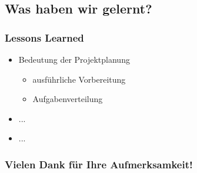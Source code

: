 \documentclass{beamer}
\begin{document}
	
	\subsection{Was haben wir gelernt?}
\begin{frame}
\frametitle{Lessons Learned}
\begin{itemize}
\item Bedeutung der Projektplanung
\begin{itemize}
	\item ausführliche Vorbereitung
	\item Aufgabenverteilung
\end{itemize}
\item ...
\item ...
\end{itemize}
\end{frame}


\begin{frame}
 \frametitle{Vielen Dank für Ihre Aufmerksamkeit!}
\end{frame}
\end{document}
